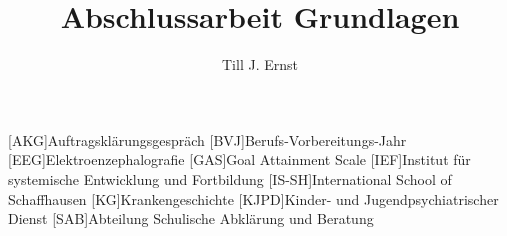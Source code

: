 


\title{Abschlussarbeit Grundlagen}
\author{Till J. Ernst}






\tableofcontents
\newpage

\begin{acronym}[KJPD]
[AKG]{Auftragsklärungsgespräch}
[BVJ]{Berufs-Vorbereitungs-Jahr}
[EEG]{Elektroenzephalografie}
[GAS]{Goal Attainment Scale}
[IEF]{Institut für systemische Entwicklung und Fortbildung}
[IS-SH]{International School of Schaffhausen}
[KG]{Krankengeschichte}
[KJPD]{Kinder- und Jugendpsychiatrischer Dienst}
[SAB]{Abteilung Schulische Abklärung und Beratung}
\end{acronym}
\newpage













\newpage
\begin{flushleft}
{}
\end{flushleft}

\renewcommand{\appendixtocname}{Anhang}
\renewcommand{\appendixname}{Anhang}
\renewcommand{\appendixpagename}{Anhang}

\newpage



%
%
%
